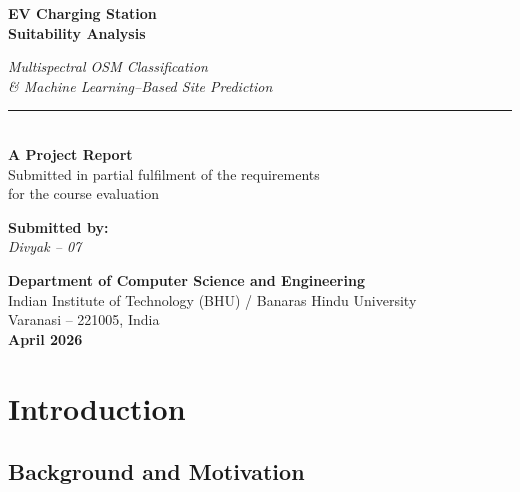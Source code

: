 \documentclass[12pt, a4paper]{article}
\begin{document}
\begin{titlepage}
\centering
\vspace*{1.5cm}

{\Huge\bfseries EV Charging Station\\[0.3cm]
Suitability Analysis\\[0.5cm]}

{\Large\itshape Multispectral OSM Classification\\
\& Machine Learning--Based Site Prediction\\[1.5cm]}

\rule{\textwidth}{1.5pt}\\[0.5cm]

{\large
\textbf{A Project Report}\\[0.3cm]
Submitted in partial fulfilment of the requirements\\
for the course evaluation\\[1.5cm]
}

{\Large
\textbf{Submitted by:}\\[0.3cm]
\textit{Divyak -- 07}\\[0.3cm]
}

\vfill

{\large
\textbf{Department of Computer Science and Engineering}\\[0.2cm]
Indian Institute of Technology (BHU) / Banaras Hindu University\\
Varanasi -- 221005, India\\[0.5cm]
\textbf{April 2026}
}

\end{titlepage}

\newpage
\tableofcontents
\newpage

\section{Introduction}

\subsection{Background and Motivation}
\end{document}
